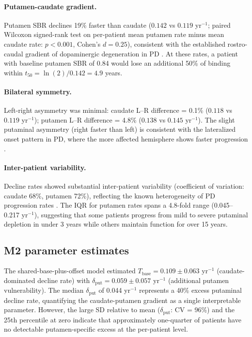 \paragraph{Putamen-caudate gradient.} Putamen SBR declines 19\% faster than caudate ($0.142$ vs $0.119$ yr$^{-1}$; paired Wilcoxon signed-rank test on per-patient mean putamen rate minus mean caudate rate: $p < 0.001$, Cohen's $d = 0.25$), consistent with the established rostro-caudal gradient of dopaminergic degeneration in PD \cite{kish1988, brooks1990, kim2022}. At these rates, a patient with baseline putamen SBR of 0.84 would lose an additional 50\% of binding within $t_{50} = \ln(2)/0.142 = 4.9$ years.

\paragraph{Bilateral symmetry.} Left-right asymmetry was minimal: caudate L--R difference = 0.1\% ($0.118$ vs $0.119$ yr$^{-1}$); putamen L--R difference = 4.8\% ($0.138$ vs $0.145$ yr$^{-1}$). The slight putaminal asymmetry (right faster than left) is consistent with the lateralized onset pattern in PD, where the more affected hemisphere shows faster progression \cite{fiorenzato2021}.

\paragraph{Inter-patient variability.} Decline rates showed substantial inter-patient variability (coefficient of variation: caudate 68\%, putamen 72\%), reflecting the known heterogeneity of PD progression rates \cite{simuni2024}. The IQR for putamen rates spans a 4.8-fold range (0.045--0.217 yr$^{-1}$), suggesting that some patients progress from mild to severe putaminal depletion in under 3 years while others maintain function for over 15 years.

\subsection{M2 parameter estimates}

The shared-base-plus-offset model estimated $T_{\text{base}} = 0.109 \pm 0.063$ yr$^{-1}$ (caudate-dominated decline rate) with $\delta_{\text{put}} = 0.059 \pm 0.057$ yr$^{-1}$ (additional putamen vulnerability). The median $\delta_{\text{put}}$ of 0.044 yr$^{-1}$ represents a 40\% excess putaminal decline rate, quantifying the caudate-putamen gradient as a single interpretable parameter. However, the large SD relative to mean ($\delta_{\text{put}}$: CV = 96\%) and the 25th percentile at zero indicate that approximately one-quarter of patients have no detectable putamen-specific excess at the per-patient level.

